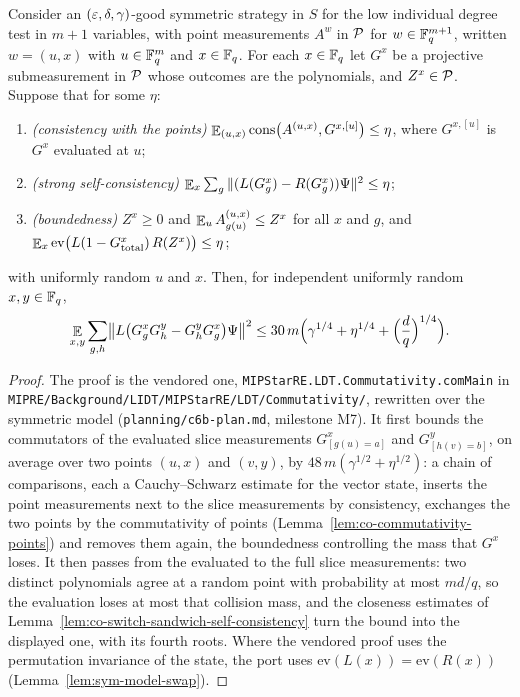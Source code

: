 \begin{lemma}
\label{lem:co-commutation-g}
\leanok
Consider an $(\eps, \delta, \gamma)$-good symmetric strategy in $S$ for the low individual degree
test in $m + 1$ variables, with point measurements $A^w$ in $\cal{P}$ for $w \in \Fq^{m+1}$,
written $w = (u, x)$ with $u \in \Fq^m$ and $x \in \Fq$. For each $x \in \Fq$ let $G^x$ be a
projective submeasurement in $\cal{P}$ whose outcomes are the polynomials, and $Z^x \in \cal{P}$.
Suppose that for some $\eta$:
\begin{enumerate}
  \item \emph{(consistency with the points)} $\E_{(u, x)} \mathrm{cons}\bigl(A^{(u, x)},
    G^{x, [u]}\bigr) \leq \eta$, where $G^{x, [u]}$ is $G^x$ evaluated at $u$;
  \item \emph{(strong self-consistency)} $\E_x \sum_g \| (L(G^x_g) - R(G^x_g)) \Psi \|^2 \leq
    \eta$;
  \item \emph{(boundedness)} $Z^x \geq 0$ and $\E_u A^{(u, x)}_{g(u)} \leq Z^x$ for all $x$ and
    $g$, and $\E_x \mathrm{ev}\bigl(L(1 - G^x_{\mathrm{total}})\, R(Z^x)\bigr) \leq \eta$;
\end{enumerate}
with uniformly random $u$ and $x$. Then, for independent uniformly random $x, y \in \Fq$,
\[
  \E_{x, y} \sum_{g, h} \bigl\| L\bigl(G^x_g G^y_h - G^y_h G^x_g\bigr) \Psi \bigr\|^2 \leq 30\, m
  \Bigl(\gamma^{1/4} + \eta^{1/4} + \Bigl(\frac{d}{q}\Bigr)^{1/4}\Bigr).
\]
\end{lemma}

\begin{proof}
\leanok
The proof is the vendored one, \texttt{MIPStarRE.LDT.Commutativity.comMain} in
\texttt{MIPRE/Background/LIDT/MIPStarRE/LDT/Commutativity/}, rewritten over the symmetric model
(\texttt{planning/c6b-plan.md}, milestone M7). It first bounds the commutators of the evaluated
slice measurements $G^x_{[g(u) = a]}$ and $G^y_{[h(v) = b]}$, on average over two points $(u, x)$
and $(v, y)$, by $48\, m (\gamma^{1/2} + \eta^{1/2})$: a chain of comparisons, each a
Cauchy--Schwarz estimate for the vector state, inserts the point measurements next to the slice
measurements by consistency, exchanges the two points by the commutativity of points
(Lemma~\ref{lem:co-commutativity-points}) and removes them again, the boundedness controlling the
mass that $G^x$ loses. It then passes from the evaluated to the full slice measurements: two
distinct polynomials agree at a random point with probability at most $md/q$, so the evaluation
loses at most that collision mass, and the closeness estimates of
Lemma~\ref{lem:co-switch-sandwich-self-consistency} turn the bound into the displayed one, with its
fourth roots. Where the vendored proof uses the permutation invariance of the state, the port uses
$\mathrm{ev}(L(x)) = \mathrm{ev}(R(x))$ (Lemma~\ref{lem:sym-model-swap}).
\end{proof}

